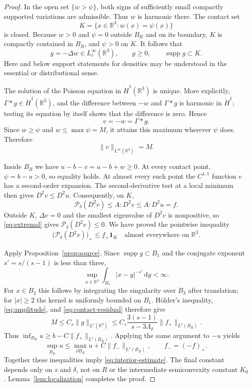 \documentclass[11pt,a4paper,reqno]{amsart}
\theoremstyle{plain}
\theoremstyle{remark}
\numberwithin{equation}{section}
\newcommand{\R}{\mathbb R}
\newcommand{\Pdelta}{\mathcal P_\delta}
\newcommand{\lam}{\Lambda_\delta}
\newcommand{\dd}{\,\mathrm d}
\newcommand{\norm}[1]{\lVert#1\rVert}
\DeclareMathOperator{\supp}{supp}
\begin{document}
\begin{proof}
In the open set $\{w>\psi\}$, both signs of sufficiently small compactly supported variations are admissible. Thus $w$ is harmonic there. The contact set
\[
 K=\{x\in\R^3:w(x)=\psi(x)\}
\]
is closed. Because $w>0$ and $\psi=0$ outside $B_R$ and on its boundary, $K$ is compactly contained in $B_R$, and $\psi>0$ on $K$. It follows that
\begin{equation}\label{eq:contact-source}
 g=-\Delta w\in L^\infty_c(\R^3),\qquad
 g\ge0,\qquad \supp g\subset K.
\end{equation}
Here and below support statements for densities may be understood in the essential or distributional sense.

The solution of the Poisson equation in $\dot H^1(\R^3)$ is unique. More explicitly, $\Gamma*g\in\dot H^1(\R^3)$, and the difference between $-w$ and $\Gamma*g$ is harmonic in $\dot H^1$; testing its equation by itself shows that the difference is zero. Hence
\[
 v=-w=\Gamma*g.
\]
Since $w\ge\psi$ and $w\le\max\psi=M$, it attains this maximum wherever $\psi$ does. Therefore
\begin{equation}\label{eq:amplitude}
 \norm v_{L^\infty(\R^3)}=M.
\end{equation}

Inside $B_R$ we have $u-b-v=u-b+w\ge0$. At every contact point, $\psi=b-u>0$, so equality holds. At almost every such point the $C^{1,1}$ function $v$ has a second-order expansion. The second-derivative test at a local minimum then gives $D^2v\le D^2u$. Consequently, on $K$,
\[
 \Pdelta(D^2v)\le A:D^2v\le A:D^2u=f.
\]
Outside $K$, $\Delta v=0$ and the smallest eigenvalue of $D^2v$ is nonpositive, so \eqref{eq:extremal} gives $\Pdelta(D^2v)\le0$. We have proved the pointwise inequality
\begin{equation}\label{eq:contact-residual}
 \bigl(\Pdelta(D^2v)\bigr)_+\le f_+\mathbf1_K
 \quad\text{almost everywhere on }\R^3.
\end{equation}

Apply Proposition~\ref{prop:source}. Since $\supp g\subset B_1$ and the conjugate exponent $s'=s/(s-1)$ is less than three,
\[
 \sup_{x\in\R^3}\int_{B_1}|x-y|^{-s'}\dd y<\infty.
\]
For $x\in B_2$ this follows by integrating the singularity over $B_3$ after translation; for $|x|\ge2$ the kernel is uniformly bounded on $B_1$. H\"older's inequality, \eqref{eq:amplitude}, and \eqref{eq:contact-residual} therefore give
\begin{equation}\label{eq:lower-maximum}
 M\le C_s\norm{g}_{L^s(\R^3)}
 \le C_s\frac{3(s-1)}{s-3\lam}\norm{f_+}_{L^s(B_R)}.
\end{equation}
Thus $\inf_{B_R}u\ge b-C\norm{f_+}_{L^s(B_R)}$. Applying the same argument to $-u$ yields
\[
 \sup_{B_R}u\le\max_{\partial B_R}u+C\norm{f_-}_{L^s(B_R)},
 \qquad f_-=(-f)_+.
\]
Together these inequalities imply \eqref{eq:interior-estimate}. The final constant depends only on $s$ and $\delta$, not on $R$ or the intermediate semiconvexity constant $K_0$. Lemma~\ref{lem:localization} completes the proof.
\end{proof}
\end{document}
